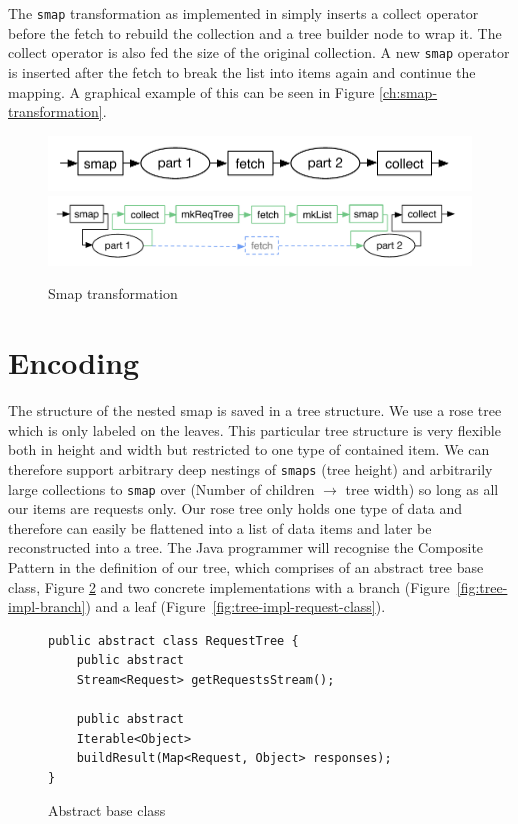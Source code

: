 The \texttt{smap} transformation as implemented in \yauhau{} simply inserts a collect operator before the fetch to rebuild the collection and a tree builder node to wrap it.
The collect operator is also fed the size of the original collection.
A new \texttt{smap} operator is inserted after the fetch to break the list into items again and continue the mapping.
A graphical example of this can be seen in Figure \ref{ch:smap-transformation}.

\begin{figure}[h]
	\includegraphics[width=\textwidth]{Figures/smap-rewrite-original}
	\includegraphics[width=\textwidth]{Figures/smap-rewrite}
	\label{fig:smap-transformation}
	\caption{Smap transformation}
\end{figure}

\section{Encoding}

The structure of the nested smap is saved in a tree structure.
We use a rose tree\cite{MALCOLM1990255} which is only labeled on the leaves.
This particular tree structure is very flexible both in height and width but restricted to one type of contained item.
We can therefore support arbitrary deep nestings of \texttt{smaps} (tree height) and arbitrarily large collections to \texttt{smap} over (Number of children $\rightarrow$ tree width) so long as all our items are requests only.
Our rose tree only holds one type of data and therefore can easily be flattened into a list of data items and later be reconstructed into a tree.
The Java programmer will recognise the Composite Pattern\cite{gamma1995design} in the definition of our tree, which comprises of an abstract tree base class, Figure \ref{fig:tree-impl-base-class} and two concrete implementations with a branch (Figure~\ref{fig:tree-impl-branch}) and a leaf (Figure~\ref{fig:tree-impl-request-class}).

\begin{figure}

\begin{verbatim}
public abstract class RequestTree {
    public abstract
    Stream<Request> getRequestsStream();

    public abstract
    Iterable<Object>
    buildResult(Map<Request, Object> responses);
}
\end{verbatim}
\caption{Abstract base class}
\label{fig:tree-impl-base-class}

\end{figure}

